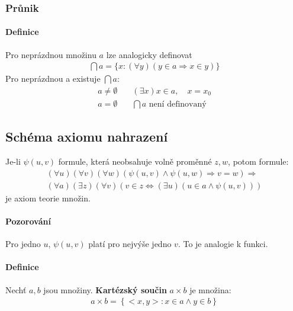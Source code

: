 \documentclass[a4paper,12pt,titlepage]{article}
\begin{document}
\subsubsection{Průnik}
\setcounter{equation}{0}
\paragraph{Definice}
Pro neprázdnou množinu $a$ lze analogicky definovat
\begin{align}
	\bigcap a = \{ x : (\forall y) (y \in a \Rightarrow x \in y) \}
\end{align}
Pro neprázdnou a existuje $\bigcap a$: 
\begin{align}
	a \neq \emptyset \quad &(\exists x) x \in a, \quad x = x_0 \\
	a = \emptyset \quad &\bigcap a \text{ není definovaný }
\end{align}


\subsection{Schéma axiomu nahrazení}
\setcounter{equation}{0}
Je-li $\psi(u,v)$ formule, která neobsahuje volně proměnné $z,w$, potom formule:
\begin{align}
	\label{axiom-nahrazeni-predpoklad}
	(\forall u)(\forall v)(\forall w) ( \psi(u,v) \land \psi(u,w) \Rightarrow
	v=w) \Rightarrow \\
	(\forall a) (\exists z) (\forall v) (v \in z \Leftrightarrow (\exists u)(u
	\in a \land \psi(u,v)))
\end{align}
je axiom teorie množin.
\paragraph{Pozorování}
Pro jedno $u$, $\psi(u,v)$ platí pro nejvýše jedno $v$. To je analogie k funkci.
\paragraph{Definice}
Nechť $a,b$ jsou množiny. \textbf{Kartézský součin} $a \times b$ je množina:
\begin{align}
	a \times b = \left\{ <x,y> : x \in a \land y \in b \right\}
\end{align}
\end{document}
